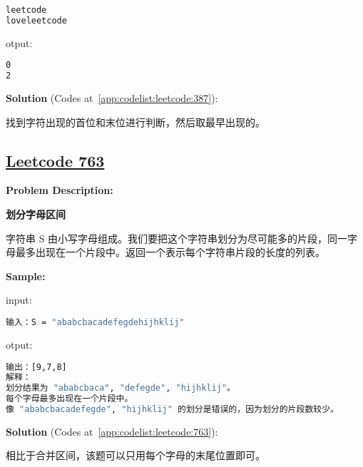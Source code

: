 \begin{lstlisting}[language=bash]
leetcode
loveleetcode
\end{lstlisting}

otput:\par

\begin{lstlisting}[language=bash]
0
2
\end{lstlisting}

\textbf{Solution }(Codes at~\ref{app:codelist:leetcode:387}):\par

找到字符出现的首位和末位进行判断，然后取最早出现的。\par



\subsection{\href{https://leetcode-cn.com/}{Leetcode 763}}\label{app:problemlist:leetcode:763}

\textbf{Problem Description:}\par

\textbf{划分字母区间}\par

字符串 S 由小写字母组成。我们要把这个字符串划分为尽可能多的片段，同一字母最多出现在一个片段中。返回一个表示每个字符串片段的长度的列表。\par


\textbf{Sample:}\par

input:\par

\begin{lstlisting}[language=bash]
输入：S = "ababcbacadefegdehijhklij"
\end{lstlisting}

otput:\par

\begin{lstlisting}[language=bash]
输出：[9,7,8]
解释：
划分结果为 "ababcbaca", "defegde", "hijhklij"。
每个字母最多出现在一个片段中。
像 "ababcbacadefegde", "hijhklij" 的划分是错误的，因为划分的片段数较少。
\end{lstlisting}

\textbf{Solution }(Codes at~\ref{app:codelist:leetcode:763}):\par

相比于合并区间，该题可以只用每个字母的末尾位置即可。\par



